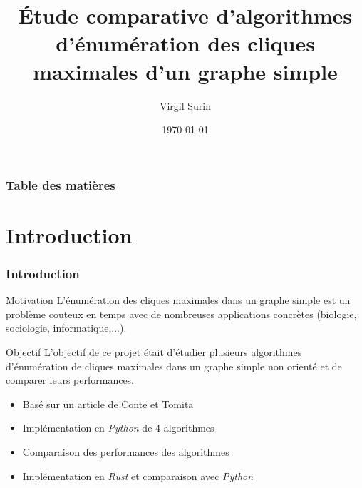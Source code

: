 \documentclass{beamer}
\title[Énumération des cliques maximales]{Étude comparative d'algorithmes d'énumération des cliques maximales d'un graphe simple} %
\author{Virgil Surin} %
\institute[UMONS] %
{
Université de Mons \\ %
\medskip
Directeur: \textit{Hadrien Mélot} %
}
\date{\today} %
\begin{document}
\begin{frame}
\titlepage %
\end{frame}

\begin{frame}
\frametitle{Table des matières} %
\tableofcontents %
\end{frame}


\section{Introduction}
\begin{frame}
\frametitle{Introduction}
\begin{block}{Motivation}
  L'énumération des cliques maximales dans un graphe simple est un problème couteux en temps avec de nombreuses applications concrètes (biologie, sociologie, informatique,...).
\end{block}
\pause
\begin{block}{Objectif}
  L'objectif de ce projet était d'étudier plusieurs algorithmes d'énumération de cliques maximales dans un graphe simple non orienté et de comparer leurs performances.
  \begin{itemize}
    \item Basé sur un article de Conte et Tomita\cite{CONTE20221}
    \item Implémentation en \emph{Python} de 4 algorithmes
    \item Comparaison des performances des algorithmes
    \item Implémentation en \emph{Rust} et comparaison avec \emph{Python}
  \end{itemize}
\end{block}
\end{frame}
\end{document}
